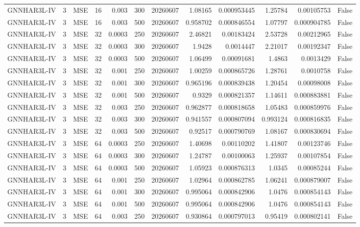 \begin{tabular}{lrlrrrrrrrrr}
GNNHAR3L-IV & 3 & MSE & 16 & 0.003 & 300 & 20260607 & 1.08165 & 0.000953445 & 1.25784 & 0.00105753 & False \\
GNNHAR3L-IV & 3 & MSE & 16 & 0.003 & 500 & 20260607 & 0.958702 & 0.000846554 & 1.07797 & 0.000904785 & False \\
GNNHAR3L-IV & 3 & MSE & 32 & 0.0003 & 250 & 20260607 & 2.46821 & 0.00183424 & 2.53728 & 0.00212965 & False \\
GNNHAR3L-IV & 3 & MSE & 32 & 0.0003 & 300 & 20260607 & 1.9428 & 0.0014447 & 2.21017 & 0.00192347 & False \\
GNNHAR3L-IV & 3 & MSE & 32 & 0.0003 & 500 & 20260607 & 1.06499 & 0.00091681 & 1.4863 & 0.0013429 & False \\
GNNHAR3L-IV & 3 & MSE & 32 & 0.001 & 250 & 20260607 & 1.00259 & 0.000865726 & 1.28761 & 0.0010758 & False \\
GNNHAR3L-IV & 3 & MSE & 32 & 0.001 & 300 & 20260607 & 0.965196 & 0.000839438 & 1.20454 & 0.00098008 & False \\
GNNHAR3L-IV & 3 & MSE & 32 & 0.001 & 500 & 20260607 & 0.9329 & 0.000821357 & 1.14611 & 0.000883881 & False \\
GNNHAR3L-IV & 3 & MSE & 32 & 0.003 & 250 & 20260607 & 0.962877 & 0.000818658 & 1.05483 & 0.000859976 & False \\
GNNHAR3L-IV & 3 & MSE & 32 & 0.003 & 300 & 20260607 & 0.941557 & 0.000807094 & 0.993124 & 0.000816835 & False \\
GNNHAR3L-IV & 3 & MSE & 32 & 0.003 & 500 & 20260607 & 0.92517 & 0.000790769 & 1.08167 & 0.000830694 & False \\
GNNHAR3L-IV & 3 & MSE & 64 & 0.0003 & 250 & 20260607 & 1.40698 & 0.00110202 & 1.41807 & 0.00123746 & False \\
GNNHAR3L-IV & 3 & MSE & 64 & 0.0003 & 300 & 20260607 & 1.24787 & 0.00100063 & 1.25937 & 0.00107854 & False \\
GNNHAR3L-IV & 3 & MSE & 64 & 0.0003 & 500 & 20260607 & 1.05923 & 0.000876313 & 1.0345 & 0.00085244 & False \\
GNNHAR3L-IV & 3 & MSE & 64 & 0.001 & 250 & 20260607 & 1.02964 & 0.000862785 & 1.06241 & 0.000879007 & False \\
GNNHAR3L-IV & 3 & MSE & 64 & 0.001 & 300 & 20260607 & 0.995064 & 0.000842906 & 1.0476 & 0.000854143 & False \\
GNNHAR3L-IV & 3 & MSE & 64 & 0.001 & 500 & 20260607 & 0.995064 & 0.000842906 & 1.0476 & 0.000854143 & False \\
GNNHAR3L-IV & 3 & MSE & 64 & 0.003 & 250 & 20260607 & 0.930864 & 0.000797013 & 0.95419 & 0.000802141 & False \\

\end{tabular}

